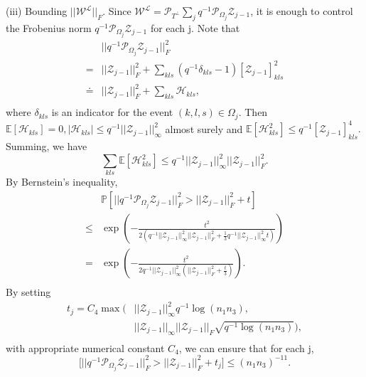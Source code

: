 \documentclass[journal,transmag]{IEEEtran}
\theoremstyle{plain}
\begin{document}
(iii) Bounding $||\mathcal{W}^{\mathcal{L}}||_F$.
Since $\mathcal{W}^{\mathcal{L}}=\mathcal{P}_{T^{\bot}}\sum_j q^{-1} \mathcal{P}_{\Omega_j}\mathcal{Z}_{j-1}$, it is enough to control the Frobenius norm $q^{-1} \mathcal{P}_{\Omega_j}\mathcal{Z}_{j-1}$ for each j. Note that
\begin{equation}
\begin{split}
&||q^{-1} \mathcal{P}_{\Omega_j}\mathcal{Z}_{j-1}||^2_F \\ =&||\mathcal{Z}_{j-1}||^2_F + \sum_{kls} (q^{-1}\delta_{kls}-1)[\mathcal{Z}_{j-1}]^2_{kls}  \\
\doteq &||\mathcal{Z}_{j-1}||^2_F + \sum_{kls}\mathcal{H}_{kls},\\
\end{split}
\end{equation}
where $\delta_{kls}$ is an indicator for the event $(k,l,s)\in \Omega_j$. Then $\mathbb{E}[\mathcal{H}_{kls}]=0, |\mathcal{H}_{kls}| \le q^{-1}||\mathcal{Z}_{j-1}||^2_{\infty}$ almost surely and $\mathbb{E}[\mathcal{H}_{kls}^2]\le q^{-1}[\mathcal{Z}_{j-1}]_{kls}^4.$ Summing, we have
\begin{equation}
{{\sum_{kls}\mathbb{E}[\mathcal{H}_{kls}^2]\le q^{-1}||\mathcal{Z}_{j-1}||^2_{\infty}||\mathcal{Z}_{j-1}||^2_F}.}
\end{equation}
By Bernstein's inequality,
\begin{equation}
\begin{split}
& \mathbb{P}[||q^{-1} \mathcal{P}_{\Omega_j}\mathcal{Z}_{j-1}||^2_F >||\mathcal{Z}_{j-1}||^2_F+t] \\
\le & \exp(-\frac{t^2}{2(q^{-1}||\mathcal{Z}_{j-1}||^2_{\infty}||\mathcal{Z}_{j-1}||^2_F+\frac{1}{3}q^{-1}||\mathcal{Z}_{j-1}||^2_{\infty}t)}) \\
= & \exp(-\frac{t^2}{2q^{-1}||\mathcal{Z}_{j-1}||^2_{\infty}(||\mathcal{Z}_{j-1}||^2_F+\frac{t}{3})}). \\
\end{split}
\end{equation}
By setting
\begin{equation}
\begin{split}
t_j = C_4 \max( &||\mathcal{Z}_{j-1}||^2_{\infty}q^{-1}\log(n_1 n_3), \\ &||\mathcal{Z}_{j-1}||_{\infty}||\mathcal{Z}_{j-1}||_F\sqrt{q^{-1}\log(n_1 n_3)}),\\
\end{split}
\end{equation}
with appropriate numerical constant $C_4$, we can ensure that for each j, \[\mathbb[||q^{-1} \mathcal{P}_{\Omega_j}\mathcal{Z}_{j-1}||^2_F >||\mathcal{Z}_{j-1}||^2_F+t_j] \le (n_1 n_3)^{-11}.\]
\end{document}

